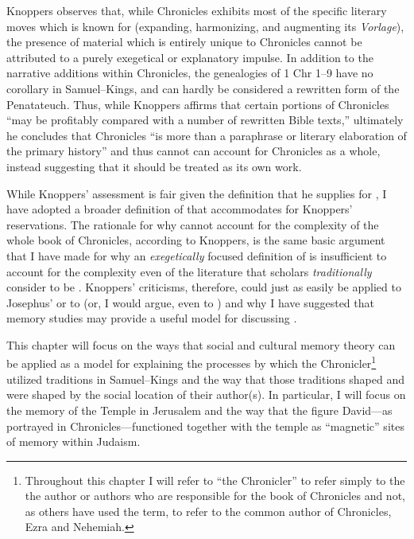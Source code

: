  Knoppers observes that, while Chronicles exhibits most of the specific literary moves which \rwb is known for (expanding, harmonizing, and augmenting its \emph{Vorlage}), the presence of material which is entirely unique to Chronicles cannot be attributed to a purely exegetical or explanatory impulse. In addition to the narrative additions within Chronicles, the genealogies of 1 Chr 1--9 have no corollary in Samuel--Kings, and can hardly be considered a rewritten form of the Penatateuch.\autocite[132]{knoppers2003} Thus, while Knoppers affirms that certain portions of Chronicles ``may be profitably compared with a number of rewritten Bible texts,''\autocite[131]{knoppers2003} ultimately he concludes that Chronicles ``is more than a paraphrase or literary elaboration of the primary history''\autocite[134]{knoppers2003} and thus \rwb cannot can account for Chronicles as a whole, instead suggesting that it should be treated as its own work.\autocite[131--134]{knoppers2003} 

 While Knoppers' assessment is fair given the definition that he supplies for \rwb, I have adopted a broader definition of \rwb that accommodates for Knoppers' reservations. The rationale for why \rwb cannot account for the complexity of the whole book of Chronicles, according to Knoppers, is the same basic argument that I have made for why an \emph{exegetically} focused definition of \rwb is insufficient to account for the complexity even of the literature that scholars \emph{traditionally} consider to be \rwb. Knoppers' criticisms, therefore, could just as easily be applied to Josephus' \ant or to \jub (or, I would argue, even to \ga) and why I have suggested that memory studies may provide a useful model for discussing \rwb. 

 This chapter will focus on the ways that social and cultural memory theory can be applied as a model for explaining the processes by which the Chronicler\footnote{Throughout this chapter I will refer to ``the   Chronicler'' to refer simply to the the author or authors who are   responsible for the book of Chronicles and not, as others have used   the term, to refer to the common author of Chronicles, Ezra and   Nehemiah.} utilized traditions in Samuel--Kings and the way that those traditions shaped and were shaped by the social location of their author(s). In particular, I will focus on the memory of the Temple in Jerusalem and the way that the figure David---as portrayed in Chronicles---functioned together with the temple as ``magnetic'' sites of memory within \secondtemple Judaism.\autocite[73]{benzvi_st2017} 

